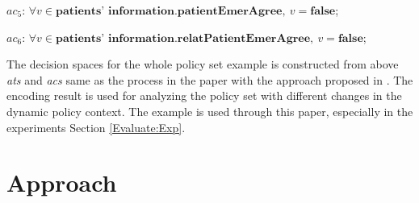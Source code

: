 \documentclass[conference]{IEEEtran}
\begin{document}
\textit{$ac_5$}: $ \forall \textit{v} \in \textbf{patients' information.patientEmerAgree}, \: \textit{v} = \textbf{false}$;

\textit{$ac_6$}: $ \forall \textit{v} \in \textbf{patients' information.relatPatientEmerAgree}, \: \textit{v} = \textbf{false}$;

The decision spaces for the whole policy set example is constructed from above \textit{ats} and \textit{acs} same as the process in the paper \cite{son2017rew} with the approach proposed in \cite{turkmen2017formal}.
The encoding result is used for analyzing the policy set with different changes in the dynamic policy context.
The example is used through this paper, especially in the experiments Section \ref{Evaluate:Exp}.






\section{Approach}\label{sec:app}
\end{document}
